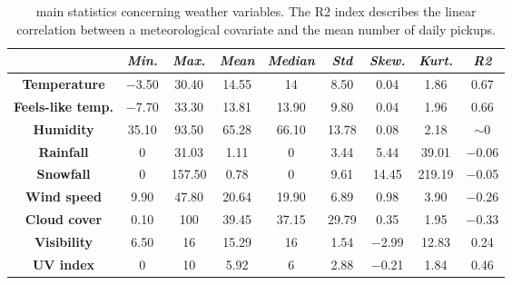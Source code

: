 \begin{table}
	\centering
	\renewcommand\arraystretch{1.3}
	\begin{tabular}{c|c|c|c|c|c|c|c|c}
		\hline
		\textit{} & \textit{Min.} & \textit{Max.} & \textit{Mean} & \textit{Median} & \textit{Std} & \textit{Skew.}  & \textit{Kurt.} & \textit{R2} \\
		\hline
		\textbf{Temperature} & \num{-3.50} & \num{30.40} & \num{14.55} & \num{14} & \num{8.50} & \num{0.04} & \num{1.86} & \num{0.67} \\
		\hline
		\textbf{Feels-like temp.} & \num{-7.70} & \num{33.30} & \num{13.81} & \num{13.90} & \num{9.80} & \num{0.04} & \num{1.96} & \num{0.66} \\
		\hline
		\textbf{Humidity} & \num{35.10} & \num{93.50} & \num{65.28} & \num{66.10} & \num{13.78} & \num{0.08} & \num{2.18} & $\sim 0$ \\
		\hline
		\textbf{Rainfall} & \num{0} & \num{31.03} & \num{1.11} & \num{0} & \num{3.44} & \num{5.44} & \num{39.01} & \num{-0.06} \\
		\hline
		\textbf{Snowfall} & \num{0} & \num{157.50} & \num{0.78} & \num{0} & \num{9.61} & \num{14.45} & \num{219.19} & \num{-0.05} \\
		\hline
		\textbf{Wind speed} & \num{9.90} & \num{47.80} & \num{20.64} & \num{19.90} & \num{6.89} & \num{0.98} & \num{3.90} & \num{-0.26} \\
		\hline
		\textbf{Cloud cover} & \num{0.10} & \num{100} & \num{39.45} & \num{37.15} & \num{29.79} & \num{0.35} &\num{ 1.95} & \num{-0.33} \\
		\hline
		\textbf{Visibility} & \num{6.50} & \num{16} & \num{15.29} & \num{16} & \num{1.54} & \num{-2.99} & \num{12.83} & \num{0.24} \\
		\hline
		\textbf{UV index} & \num{ 0} & \num{10} & \num{5.92} & \num{6} & \num{2.88} & \num{-0.21} & \num{1.84} & \num{0.46} \\
		\hline
	\end{tabular}
	\caption[Main statistics concerning weather variables]{main statistics concerning weather variables. The R2 index describes the linear correlation between a meteorological covariate and the mean number of daily pickups.}
	\label{Weather_stats}
\end{table}

